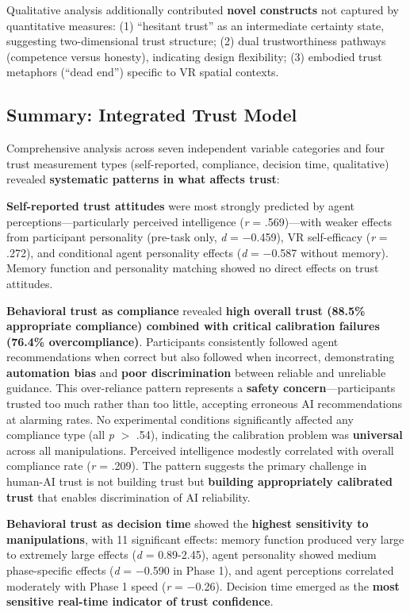 \documentclass[12pt]{article}
\begin{document}
Qualitative analysis additionally contributed \textbf{novel constructs} not captured by quantitative measures: (1) ``hesitant trust'' as an intermediate certainty state, suggesting two-dimensional trust structure; (2) dual trustworthiness pathways (competence versus honesty), indicating design flexibility; (3) embodied trust metaphors (``dead end'') specific to VR spatial contexts.

\subsection{Summary: Integrated Trust Model}

Comprehensive analysis across seven independent variable categories and four trust measurement types (self-reported, compliance, decision time, qualitative) revealed \textbf{systematic patterns in what affects trust}:

\textbf{Self-reported trust attitudes} were most strongly predicted by agent perceptions—particularly perceived intelligence (\textit{r} = .569)—with weaker effects from participant personality (pre-task only, \textit{d} = $-$0.459), VR self-efficacy (\textit{r} = .272), and conditional agent personality effects (\textit{d} = $-$0.587 without memory). Memory function and personality matching showed no direct effects on trust attitudes.

\textbf{Behavioral trust as compliance} revealed \textbf{high overall trust (88.5\% appropriate compliance) combined with critical calibration failures (76.4\% overcompliance)}. Participants consistently followed agent recommendations when correct but also followed when incorrect, demonstrating \textbf{automation bias} and \textbf{poor discrimination} between reliable and unreliable guidance. This over-reliance pattern represents a \textbf{safety concern}---participants trusted too much rather than too little, accepting erroneous AI recommendations at alarming rates. No experimental conditions significantly affected any compliance type (all \textit{p} $>$ .54), indicating the calibration problem was \textbf{universal} across all manipulations. Perceived intelligence modestly correlated with overall compliance rate (\textit{r} = .209). The pattern suggests the primary challenge in human-AI trust is not building trust but \textbf{building appropriately calibrated trust} that enables discrimination of AI reliability.

\textbf{Behavioral trust as decision time} showed the \textbf{highest sensitivity to manipulations}, with 11 significant effects: memory function produced very large to extremely large effects (\textit{d} = 0.89-2.45), agent personality showed medium phase-specific effects (\textit{d} = $-$0.590 in Phase 1), and agent perceptions correlated moderately with Phase 1 speed (\textit{r} = $-$0.26). Decision time emerged as the \textbf{most sensitive real-time indicator of trust confidence}.
\end{document}
